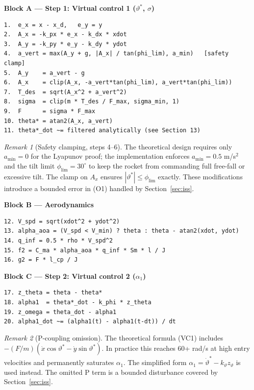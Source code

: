 \documentclass[11pt,a4paper]{article}
\theoremstyle{plain}
\theoremstyle{remark}
\newtheorem{remark}{Remark}[section]
\newcommand{\vth}{\vartheta}
\newcommand{\vths}{\vartheta^*}
\newcommand{\zth}{z_{\vth}}
\begin{document}
\textbf{Block A --- Step 1: Virtual control 1 ($\vths$, $\sigma$)}

\begin{lstlisting}
1.  e_x = x - x_d,   e_y = y
2.  A_x = -k_px * e_x - k_dx * xdot
3.  A_y = -k_py * e_y - k_dy * ydot
4.  a_vert = max(A_y + g, |A_x| / tan(phi_lim), a_min)   [safety clamp]
5.  A_y    = a_vert - g
6.  A_x    = clip(A_x, -a_vert*tan(phi_lim), a_vert*tan(phi_lim))
7.  T_des  = sqrt(A_x^2 + a_vert^2)
8.  sigma  = clip(m * T_des / F_max, sigma_min, 1)
9.  F      = sigma * F_max
10. theta* = atan2(A_x, a_vert)
11. theta*_dot ~= filtered analytically (see Section 13)
\end{lstlisting}

\begin{remark}[Safety clamping, steps 4--6]
The theoretical design requires only $a_{\min} = 0$ for the Lyapunov proof; the implementation enforces $a_{\min} = 0.5$ m/s$^2$ and the tilt limit $\phi_{\lim} = 30^{\circ}$ to keep the rocket from commanding full free-fall or excessive tilt. The clamp on $A_x$ ensures $|\vths| \leq \phi_{\lim}$ exactly. These modifications introduce a bounded error in (O1) handled by Section~\ref{sec:iss}.
\end{remark}

\textbf{Block B --- Aerodynamics}

\begin{lstlisting}
12. V_spd = sqrt(xdot^2 + ydot^2)
13. alpha_aoa = (V_spd < V_min) ? theta : theta - atan2(xdot, ydot)
14. q_inf = 0.5 * rho * V_spd^2
15. f2 = C_ma * alpha_aoa * q_inf * Sm * l / J
16. g2 = F * l_cp / J
\end{lstlisting}

\textbf{Block C --- Step 2: Virtual control 2 ($\alpha_1$)}

\begin{lstlisting}
17. z_theta = theta - theta*
18. alpha1  = theta*_dot - k_phi * z_theta
19. z_omega = theta_dot - alpha1
20. alpha1_dot ~= (alpha1(t) - alpha1(t-dt)) / dt
\end{lstlisting}

\begin{remark}[P-coupling omission]
The theoretical formula (VC1) includes $-(F/m)(\dot x\cos\vths - \dot y\sin\vths)$. In practice this reaches 60+ rad/s at high entry velocities and permanently saturates $\alpha_1$. The simplified form $\alpha_1 = \dot\vths - k_\vth\zth$ is used instead. The omitted P term is a bounded disturbance covered by Section~\ref{sec:iss}.
\end{remark}
\end{document}
